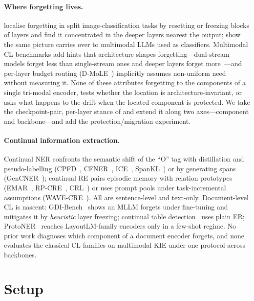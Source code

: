 \documentclass{article}
\begin{document}
\paragraph{Where forgetting lives.} \citet{ramasesh2021anatomy} localise forgetting in split image-classification tasks by resetting or freezing blocks of layers and find it concentrated in the deeper layers nearest the output; \citet{zhai2023investigating} show the same picture carries over to multimodal LLMs used as classifiers. Multimodal CL benchmarks add hints that architecture shapes forgetting---dual-stream models forget less than single-stream ones and deeper layers forget more~\citep{zhang2025clcrossvqa}---and per-layer budget routing (D-MoLE~\citep{ge2025dmole}) implicitly assumes non-uniform need without measuring it. None of these attributes forgetting to the components of a single tri-modal encoder, tests whether the location is architecture-invariant, or asks what happens to the drift when the located component is protected. We take the checkpoint-pair, per-layer stance of \citet{ramasesh2021anatomy} and extend it along two axes---component and backbone---and add the protection/migration experiment.

\paragraph{Continual information extraction.} Continual NER confronts the semantic shift of the ``O'' tag with distillation and pseudo-labelling (CPFD~\citep{zhang2023cpfd}, CFNER~\citep{zheng2022cfner}, ICE~\citep{liu2023ice}, SpanKL~\citep{zheng2023spankl}) or by generating spans (GenCNER~\citep{gencner}); continual RE pairs episodic memory with relation prototypes (EMAR~\citep{han2020emar}, RP-CRE~\citep{cui2021rpcre}, CRL~\citep{zhao2022crl}) or uses prompt pools under task-incremental assumptions (WAVE-CRE~\citep{le2025wavecre}). All are sentence-level and text-only. Document-level CL is nascent: GDI-Bench~\citep{gdibench} shows an MLLM forgets under fine-tuning and mitigates it by \emph{heuristic} layer freezing; continual table detection~\citep{minouei2022table} uses plain ER; ProtoNER~\citep{kumar2024protoner} reaches LayoutLM-family encoders only in a few-shot regime. No prior work diagnoses which component of a document encoder forgets, and none evaluates the classical CL families on multimodal KIE under one protocol across backbones.

\section{Setup}
\label{sec:setup}
\end{document}
